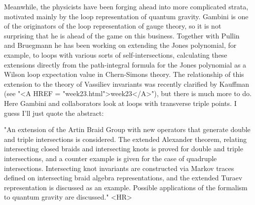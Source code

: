 Meanwhile, the physicists have been forging ahead into more complicated
strata, motivated mainly by the loop representation of quantum gravity.
Gambini is one of the originators of the loop representation of gauge
theory, so it is not surprising that he is ahead of the game on this
business.  Together with Pullin and Bruegmann he has been working on
extending the Jones polynomial, for example, to loops with various sorts
of self-intersections, calculating these extensions directly from the
path-integral formula for the Jones polynomial as a Wilson loop
expectation value in Chern-Simons theory.  The relationship of this
extension to the theory of Vassiliev invariants was recently clarified
by Kauffman (see "<A HREF = "week23.html">week23</A>"), but there is much more to do.  Here Gambini
and collaborators look at loops with transverse triple points.  I guess
I'll just quote the abstract:

"An extension of the Artin Braid Group with new operators that generate
double and triple intersections is considered. The extended Alexander
theorem, relating intersecting closed braids and intersecting knots is
proved for double and triple intersections, and a counter example is
given for the case of quadruple intersections. Intersecting knot
invariants are constructed via Markov traces defined on intersecting
braid algebra representations, and the extended Turaev representation is
discussed as an example. Possible applications of the formalism to
quantum gravity are discussed."
<HR>



